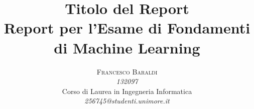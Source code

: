 \documentclass[10pt,a4paper]{article}
\begin{document}
\title{Titolo del Report \\
\Large{Report per l'Esame di Fondamenti di Machine Learning}
} %

\author{\textsc{Francesco Baraldi} \\
    \emph{132097} \\
    Corso di Laurea in Ingegneria Informatica\\
    \emph{256745@studenti.unimore.it}
  }

\date{}

\maketitle %

\begin{abstract}
\normalsize
\lipsum[9]

\end{abstract}




{}

\end{document}
